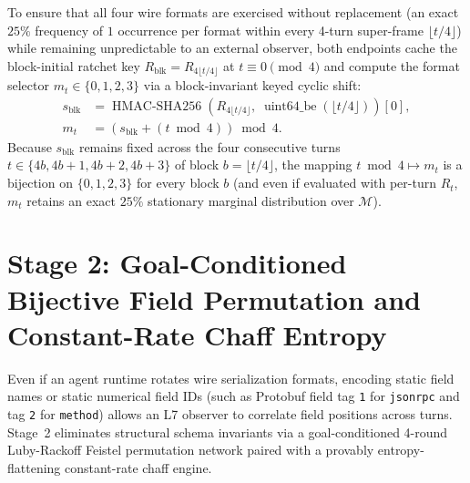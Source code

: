 \documentclass[conference,10pt]{IEEEtran}
\begin{document}
To ensure that all four wire formats are exercised without replacement (an exact $25\%$ frequency of $1$ occurrence per format within every 4-turn super-frame $\lfloor t / 4 \rfloor$) while remaining unpredictable to an external observer, both endpoints cache the block-initial ratchet key $R_{\text{blk}} = R_{4\lfloor t / 4 \rfloor}$ at $t \equiv 0 \pmod 4$ and compute the format selector $m_t \in \{0,1,2,3\}$ via a block-invariant keyed cyclic shift:
\begin{equation}
\label{eq:format_select}
\begin{aligned}
s_{\text{blk}} &= \operatorname{HMAC-SHA256}\left(R_{4\lfloor t / 4 \rfloor},\; \operatorname{uint64\_be}(\lfloor t / 4 \rfloor)\right)[0], \\
m_t &= \left(s_{\text{blk}} + (t \bmod 4)\right) \bmod 4.
\end{aligned}
\end{equation}
Because $s_{\text{blk}}$ remains fixed across the four consecutive turns $t \in \{4b, 4b+1, 4b+2, 4b+3\}$ of block $b = \lfloor t/4 \rfloor$, the mapping $t \bmod 4 \mapsto m_t$ is a bijection on $\{0,1,2,3\}$ for every block $b$ (and even if evaluated with per-turn $R_t$, $m_t$ retains an exact $25\%$ stationary marginal distribution over $\mathcal{M}$).

\section{Stage 2: Goal-Conditioned Bijective Field Permutation and Constant-Rate Chaff Entropy}
\label{sec:stage2}

Even if an agent runtime rotates wire serialization formats, encoding static field names or static numerical field IDs (such as Protobuf field tag \texttt{1} for \texttt{jsonrpc} and tag \texttt{2} for \texttt{method}) allows an L7 observer to correlate field positions across turns. Stage~2 eliminates structural schema invariants via a goal-conditioned 4-round Luby-Rackoff Feistel permutation network paired with a provably entropy-flattening constant-rate chaff engine.
\end{document}

